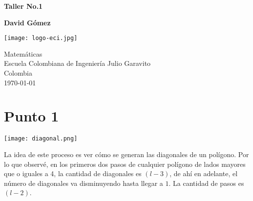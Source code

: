 \documentclass{article}
\begin{document}
\begin{titlepage}
	\begin{center}
		\vspace*{1cm}

		\textbf{\Large{Taller No.1}}

		\vspace{1.5cm}

		\textbf{David Gómez}

		\vspace{5cm}

		\texttt{[image: logo-eci.jpg]}

		\vspace{5cm}

		Matemáticas\\
		Escuela Colombiana de Ingeniería Julio Garavito\\
		Colombia\\
		\today

	\end{center}
\end{titlepage}

\section{Punto 1}
\begin{center}
    \texttt{[image: diagonal.png]}
\end{center}
La idea de este proceso es ver cómo se generan las diagonales de un polígono. Por lo que observé, en los primeros dos pasos de cualquier polígono de lados mayores que o iguales a 4, la cantidad de diagonales es $(l-3)$, de ahí en adelante, el número de diagonales va disminuyendo hasta llegar a $1$. La cantidad de pasos es $(l-2)$.
\end{document}
